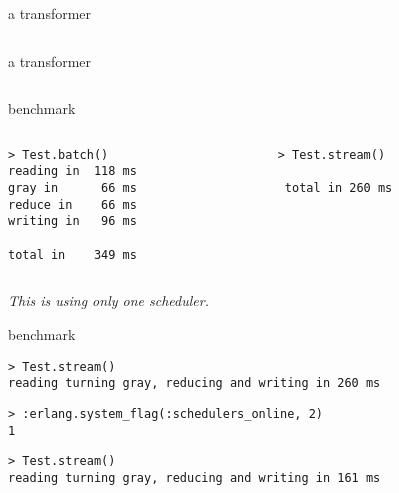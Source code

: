 \begin{frame}[fragile]{a transformer}
\begin{verbatim}

\end{verbatim}
\end{frame}


\begin{frame}[fragile]{a transformer}
\begin{verbatim}

\end{verbatim}
\end{frame}

\begin{frame}[fragile]{benchmark}

\begin{columns}
 \begin{column}{0.5\linewidth}
\begin{verbatim}
> Test.batch()
reading in  118 ms 
gray in      66 ms 
reduce in    66 ms 
writing in   96 ms 

total in    349 ms
\end{verbatim}
 \end{column}
\pause
 \begin{column}{0.5\linewidth}
\begin{verbatim}
> Test.stream()

 total in 260 ms 
\end{verbatim}
 \end{column}
\end{columns}

\pause\vspace{10pt}
{\em This is using only one scheduler.}

\end{frame}

\begin{frame}[fragile]{benchmark}

\begin{verbatim}
> Test.stream()
reading turning gray, reducing and writing in 260 ms 
\end{verbatim}
\pause
\begin{verbatim}
> :erlang.system_flag(:schedulers_online, 2)
1
\end{verbatim}
\pause
\begin{verbatim}
> Test.stream()
reading turning gray, reducing and writing in 161 ms 
\end{verbatim}

\end{frame}


